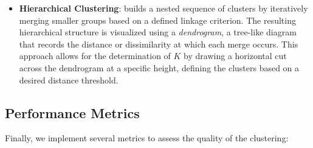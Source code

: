 \documentclass[prl,twocolumn]{revtex4-1}
\begin{document}
\begin{itemize}[leftmargin=0pt, itemsep=0pt]
\item[] \textbf{Hierarchical Clustering}:
    builds a nested sequence of clusters by iteratively merging smaller groups based on a defined linkage criterion. The resulting hierarchical structure is visualized using a \textit{dendrogram}, a tree-like diagram that records the distance or dissimilarity at which each merge occurs. This approach allows for the determination of $K$ by drawing a horizontal cut across the dendrogram at a specific height, defining the clusters based on a desired distance threshold.

\end{itemize}

\vspace{-1.5em}
\subsection{Performance Metrics}
\vspace{-1em}
\noindent Finally, we implement several metrics to assess the quality of the clustering:
\vspace{-0.5em}
\end{document}
